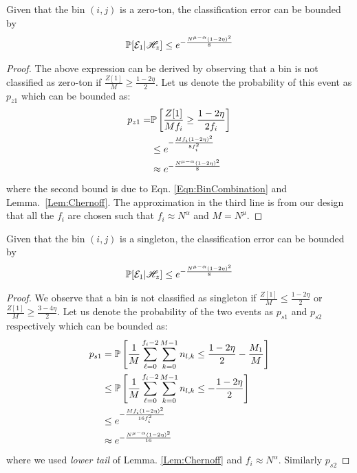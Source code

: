 \begin{lemma}
Given that the bin $(i,j)$ is a zero-ton, the classification error can be bounded by
\begin{align*}
\mathbb{P}[\mathcal{E}_1|\mathscr{H}_z]\leq e^{-\frac{N^{\mu-\alpha}(1-2\eta)^2}{8}}
\end{align*}
\end{lemma}
\begin{proof}
The above expression can be derived by observing that a bin is not classified as zero-ton if $\frac{Z[1]}{M}\geq\frac{1-2\eta}{2}$. Let us denote the probability of this event as $p_{z1}$ which can be bounded as:
\begin{align*}
p_{z1}=&\mathbb{P}\left[\frac{Z[1]}{Mf_i}\geq\frac{1-2\eta}{2f_i}\right]\\
&\leq e^{-\frac{Mf_i(1-2\eta)^2}{8f_i^{2}}}\\
&\approx e^{-\frac{N^{\mu-\alpha}(1-2\eta)^2}{8}}
\end{align*} 
where the second bound is due to Eqn. \eqref{Eqn:BinCombination} and Lemma.~\ref{Lem:Chernoff}. The approximation in the third line is from our design that all the $f_i$ are chosen such that $f_i\approx N^{\alpha}$ and $M=N^{\mu}.$
\end{proof}

\begin{lemma}[singleton]
Given that the bin $(i,j)$ is a singleton, the classification error can be bounded by
\begin{align*}
\mathbb{P}[\mathcal{E}_1|\mathscr{H}_z]\leq e^{-\frac{N^{\mu-\alpha}(1-2\eta)^2}{8}}
\end{align*}
\end{lemma}
\begin{proof}
We observe that a bin is not classified as singleton if $\frac{Z[1]}{M}\leq\frac{1-2\eta}{2}$ or $\frac{Z[1]}{M}\geq\frac{3-4\eta}{2}$. Let us denote the probability of the two events as $p_{s1}$ and $p_{s2}$ respectively which can be bounded as:
\begin{align*}
p_{s1}&=\mathbb{P}\left[\frac{1}{M}\sum\limits_{\ell=0}^{f_{i}-2}\sum\limits_{k=0}^{M-1} n_{l,k}\leq\frac{1-2\eta}{2}-\frac{M_1}{M}\right]\\
&\leq \mathbb{P}\left[\frac{1}{M}\sum\limits_{\ell=0}^{f_{i}-2}\sum\limits_{k=0}^{M-1} n_{l,k}\leq-\frac{1-2\eta}{2}\right]\\
&\leq e^{-\frac{Mf_i(1-2\eta)^2}{16f_i^{2}}}\\
&\approx e^{-\frac{N^{\mu-\alpha}(1-2\eta)^2}{16}}
\end{align*} 
where we used  {\it lower tail} of Lemma. \ref{Lem:Chernoff} and $f_i\approx N^{\alpha}$. Similarly $p_{s2}$
\end{proof}

